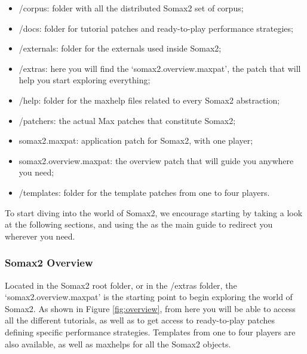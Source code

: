 \begin{itemize}
    \item /corpus: folder with all the distributed Somax2 set of corpus;
    \item /docs: folder for tutorial patches and ready-to-play performance strategies;
    \item /externals: folder for the externals used inside Somax2;
    \item /extras: here you will find the `somax2.overview.maxpat', the patch that will help you start exploring everything;
    \item /help: folder for the maxhelp files related to every Somax2 abstraction;
    \item /patchers: the actual Max patches that constitute Somax2;
    \item somax2.maxpat: application patch for Somax2, with one player;
    \item somax2.overview.maxpat: the overview patch that will guide you anywhere you need;
    \item /templates: folder for the template patches from one to four players.
\end{itemize}

\noindent To start diving into the world of Somax2, we encourage starting by taking a look at the following sections, and using the  as the main guide to redirect you wherever you need.

\subsubsection{Somax2 Overview}

Located in the Somax2 root folder, or in the /extras folder, the `somax2.overview.maxpat' is the starting point to begin exploring the  world of Somax2. 
As shown in Figure \ref{fig:overview}, from here you will be able to access all the different tutorials, as well as to get access to ready-to-play patches defining specific performance strategies. Templates from one to four players are also available, as well as maxhelps for all the Somax2 objects.

